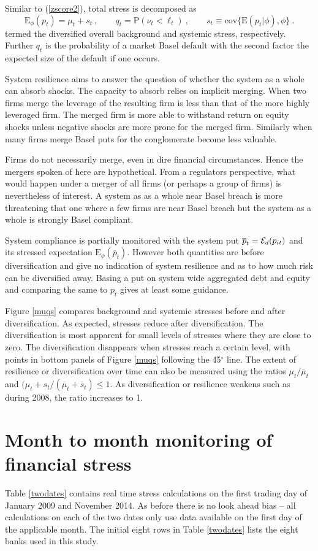 \documentclass[12pt]{article}
\newcommand{\E}{\mathrm{E}}
\newcommand{\cov}{\mathrm{cov}}
\newcommand{\Ex}{{\cal E}}
\newcommand{\Exd}{\Ex_d}
\newcommand{\Es}{\E_\phi}
\newcommand{\eref}[1]{(\ref{#1})}
\newcommand{\fref}[1]{Figure \ref{#1}}
\newcommand{\tref}[1]{Table \ref{#1}}
\newcommand{\cq}{\ , \qquad}
\renewcommand{\P}{\mathrm{P}}
\newcommand{\be}[1]{\begin{equation}\label{#1}}
\newcommand{\ee}{\end{equation}}
\begin{document}
Similar  to \eref{zscore2}, total  stress is decomposed as
\be{overall}
\Es(p_t) = \mu_t  + s_t\cq q_{t}=\P(\nu_t<\ell_t) \cq  s_t \equiv \cov\{\E(p_t|\phi),\phi\}\ .
\ee
termed the diversified overall background  and systemic stress, respectively.   Further $q_t$ is the probability of  a market Basel default with the second factor the expected size of the default if one occurs.

System resilience aims to answer the question of whether the system as a whole can absorb shocks.   The capacity to absorb relies on implicit merging.  When two firms merge the leverage of the resulting firm is less than that of the more highly leveraged firm.   The merged firm is more able to withstand return on equity shocks  unless negative shocks are more prone for the merged firm.   Similarly when many firms merge Basel puts for the conglomerate become less valuable.

Firms do not necessarily merge, even in dire financial circumstances.   Hence the mergers spoken of here are hypothetical.   From a regulators perspective, what would happen under a merger of all firms (or perhaps a group of firms) is nevertheless of interest.   A system as as a whole near Basel breach is more threatening that one where a few firms are near Basel breach but the system as a whole is strongly Basel compliant.

System compliance is partially monitored with the system put $\overline p_t=\Exd(p_{it})$ and its stressed expectation $\Es(\overline p_t)$. However both quantities are before diversification and give no indication of system resilience and as to how much risk can be diversified away. Basing a put on system wide aggregated debt and equity and comparing the same to $p_t$  gives at least some guidance.

\fref{muqs} compares background and systemic stresses before and after diversification. As expected, stresses reduce after diversification. The diversification is most apparent for small levels of stresses where they are close to zero. The diversification disappears when stresses reach a certain level, with points in bottom panels of \fref{muqs} following the 45$^\circ$ line. The extent of resilience or diversification over time can also be measured using the ratios $\mu_t/\overline \mu_t$ and $(\mu_t+s_t/(\overline \mu_t+\overline s_t)\le 1$. As diversification or resilience weakens such as during 2008, the ratio increases to 1.

\section{Month to month monitoring  of financial stress}\label{monitoring}
 \tref{twodates} contains real time stress calculations on the first trading day of  January 2009 and November 2014.  As before there is no look ahead bias -- all calculations on each of the two dates only use data available on the first day of the applicable month.   The initial eight rows in \tref{twodates} lists the eight banks used in this study. 
 
\end{document}
